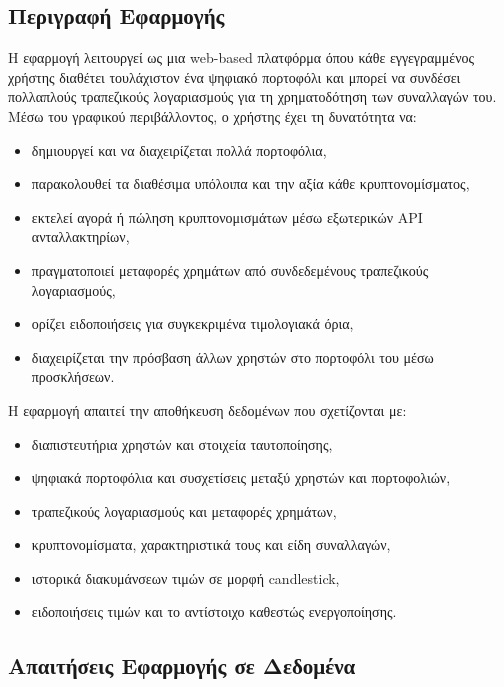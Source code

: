 \documentclass[a4paper,12pt]{article}
\begin{document}
\subsection{Περιγραφή Εφαρμογής}
Η εφαρμογή λειτουργεί ως μια web-based πλατφόρμα όπου κάθε εγγεγραμμένος χρήστης διαθέτει
τουλάχιστον ένα ψηφιακό πορτοφόλι και μπορεί να συνδέσει πολλαπλούς τραπεζικούς λογαριασμούς για
τη χρηματοδότηση των συναλλαγών του. Μέσω του γραφικού περιβάλλοντος, ο χρήστης έχει τη
δυνατότητα να:

\begin{itemize}
    \item δημιουργεί και να διαχειρίζεται πολλά πορτοφόλια,
    \item παρακολουθεί τα διαθέσιμα υπόλοιπα και την αξία κάθε κρυπτονομίσματος,
    \item εκτελεί αγορά ή πώληση κρυπτονομισμάτων μέσω εξωτερικών API ανταλλακτηρίων,
    \item πραγματοποιεί μεταφορές χρημάτων από συνδεδεμένους τραπεζικούς λογαριασμούς,
    \item ορίζει ειδοποιήσεις για συγκεκριμένα τιμολογιακά όρια,
    \item διαχειρίζεται την πρόσβαση άλλων χρηστών στο πορτοφόλι του μέσω προσκλήσεων.
\end{itemize}

Η εφαρμογή απαιτεί την αποθήκευση δεδομένων που σχετίζονται με:

\begin{itemize}
    \item διαπιστευτήρια χρηστών και στοιχεία ταυτοποίησης,
    \item ψηφιακά πορτοφόλια και συσχετίσεις μεταξύ χρηστών και πορτοφολιών,
    \item τραπεζικούς λογαριασμούς και μεταφορές χρημάτων,
    \item κρυπτονομίσματα, χαρακτηριστικά τους και είδη συναλλαγών,
    \item ιστορικά διακυμάνσεων τιμών σε μορφή candlestick,
    \item ειδοποιήσεις τιμών και το αντίστοιχο καθεστώς ενεργοποίησης.
\end{itemize}

\subsection{Απαιτήσεις Εφαρμογής σε Δεδομένα}
\end{document}
